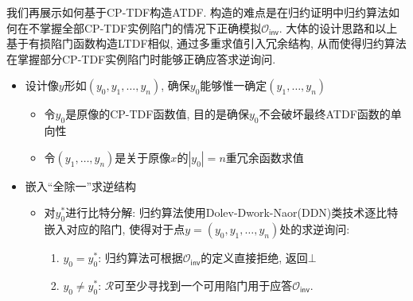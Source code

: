 我们再展示如何基于CP-TDF构造ATDF. 构造的难点是在归约证明中归约算法如何在不掌握全部CP-TDF实例陷门的情况下正确模拟$\mathcal{O}_\mathsf{inv}$. 
大体的设计思路和以上基于有损陷门函数构造LTDF相似, 通过多重求值引入冗余结构, 从而使得归约算法在掌握部分CP-TDF实例陷门时能够正确应答求逆询问. 
\begin{itemize} 
    \item 设计像$y$形如$(y_0, y_1, \dots, y_n)$, 确保$y_0$能够惟一确定$(y_1, \dots, y_n)$
    \begin{itemize}
    	\item 令$y_0$是原像的CP-TDF函数值, 目的是确保$y_0$不会破坏最终ATDF函数的单向性
    	\item 令$(y_1, \dots, y_n)$是关于原像$x$的$|y_0| = n$重冗余函数求值 
    \end{itemize}
    \item 嵌入``全除一''求逆结构
    \begin{itemize}
        \item 对$y_0^*$进行比特分解: 归约算法使用Dolev-Dwork-Naor(DDN)类技术逐比特嵌入对应的陷门, 
        	使得对于点$y = (y_0, y_1, \dots, y_n)$处的求逆询问: 
        \begin{enumerate}
		    \item $y_0 = y_0^*$: 归约算法可根据$\mathcal{O}_\mathsf{inv}$的定义直接拒绝, 返回$\bot$ 
    		\item $y_0 \neq y_0^*$: $\mathcal{R}$可至少寻找到一个可用陷门用于应答$\mathcal{O}_\mathsf{inv}$. 
		\end{enumerate} 
    \end{itemize}
\end{itemize} 

